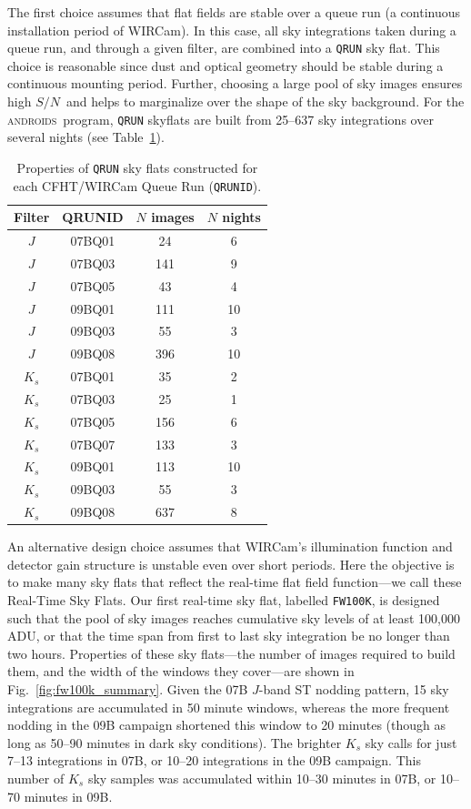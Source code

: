 \documentclass[iop]{emulateapj}
\newcommand{\sn}{\ensuremath{S/N}} %
\newcommand{\androids}{\textsc{androids}}
\newcommand{\Fig}[1]{Fig.~\ref{fig:#1}}  %
\newcommand{\Tab}[1]{Table~\ref{tab:#1}}  %
\begin{document}
The first choice assumes that flat fields are stable over a queue run (a continuous installation period of WIRCam).
In this case, all sky integrations taken during a queue run, and through a given filter, are combined into a \texttt{QRUN} sky flat.
This choice is reasonable since dust and optical geometry should be stable during a continuous mounting period.
Further, choosing a large pool of sky images ensures high \sn\, and helps to marginalize over the shape of the sky background.
For the \androids\ program, \texttt{QRUN} skyflats are built from 25--637 sky integrations over several nights (see \Tab{qrunflattable}).

\begin{table}[t]
\centering
\caption{Properties of \texttt{QRUN} sky flats constructed for each CFHT/WIRCam Queue Run (\texttt{QRUNID}).}
\label{tab:qrunflattable}

\begin{tabular}{cccc}
\hline
Filter & QRUNID & $N$ images & $N$ nights \\
\hline
$J$ & 07BQ01 & 24 & 6 \\
$J$ & 07BQ03 & 141 & 9 \\
$J$ & 07BQ05 & 43 & 4 \\
$J$ & 09BQ01 & 111 & 10 \\
$J$ & 09BQ03 & 55 & 3 \\
$J$ & 09BQ08 & 396 & 10 \\
\hline
$K_s$ & 07BQ01 & 35 & 2 \\
$K_s$ & 07BQ03 & 25 & 1 \\
$K_s$ & 07BQ05 & 156 & 6 \\
$K_s$ & 07BQ07 & 133 & 3 \\
$K_s$ & 09BQ01 & 113 & 10 \\
$K_s$ & 09BQ03 & 55 & 3 \\
$K_s$ & 09BQ08 & 637 & 8 \\
\hline
\end{tabular}
\end{table}

An alternative design choice assumes that WIRCam's illumination function and detector gain structure is unstable even over short periods.
Here the objective is to make many sky flats that reflect the real-time flat field function---we call these Real-Time Sky Flats.
Our first real-time sky flat, labelled \texttt{FW100K}, is designed such that the pool of sky images reaches cumulative sky levels of at least 100,000 ADU, or that the time span from first to last sky integration be no longer than two hours.
Properties of these sky flats---the number of images required to build them, and the width of the windows they cover---are shown in \Fig{fw100k_summary}.
Given the 07B $J$-band ST nodding pattern, 15 sky integrations are accumulated in 50 minute windows, whereas the more frequent nodding in the 09B campaign shortened this window to 20 minutes (though as long as 50--90 minutes in dark sky conditions).
The brighter $K_s$ sky calls for just 7--13 integrations in 07B, or 10--20 integrations in the 09B campaign.
This number of $K_s$ sky samples was accumulated within 10--30 minutes in 07B, or 10--70 minutes in 09B.
\end{document}
